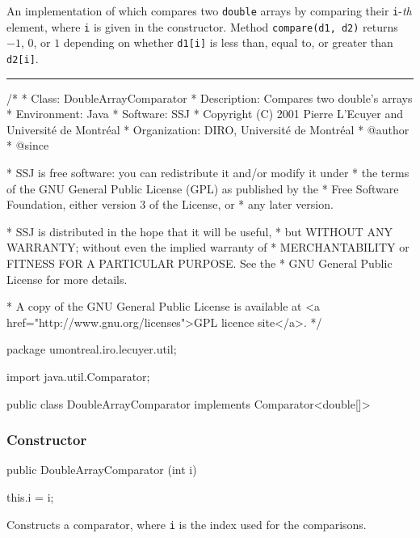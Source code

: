 
An implementation of  which compares two
\texttt{double} arrays by comparing their \texttt{i}-\emph{th} element,
where \texttt{i} is given in the constructor.
Method \texttt{compare(d1, d2)} returns $-1$, $0$, or $1$ depending on
whether \texttt{d1[i]} is less than, equal to, or greater than
\texttt{d2[i]}.

\bigskip\hrule

\begin{code}\begin{hide}
/*
 * Class:        DoubleArrayComparator
 * Description:  Compares two double's arrays
 * Environment:  Java
 * Software:     SSJ 
 * Copyright (C) 2001  Pierre L'Ecuyer and Université de Montréal
 * Organization: DIRO, Université de Montréal
 * @author       
 * @since

 * SSJ is free software: you can redistribute it and/or modify it under
 * the terms of the GNU General Public License (GPL) as published by the
 * Free Software Foundation, either version 3 of the License, or
 * any later version.

 * SSJ is distributed in the hope that it will be useful,
 * but WITHOUT ANY WARRANTY; without even the implied warranty of
 * MERCHANTABILITY or FITNESS FOR A PARTICULAR PURPOSE.  See the
 * GNU General Public License for more details.

 * A copy of the GNU General Public License is available at
   <a href="http://www.gnu.org/licenses">GPL licence site</a>.
 */
\end{hide}
package umontreal.iro.lecuyer.util;
\begin{hide}
import java.util.Comparator;
\end{hide}

public class DoubleArrayComparator implements Comparator<double[]> \begin{hide} {
   private int i;
\end{hide}
\end{code}

\subsubsection* {Constructor}
\begin{code}

   public DoubleArrayComparator (int i) \begin{hide} {
      this.i = i;
   }
\end{hide}\end{code}
\begin{tabb}
 Constructs a comparator, where \texttt{i} is the index
 used for the comparisons.
\end{tabb}
\begin{htmlonly}
\end{htmlonly}


